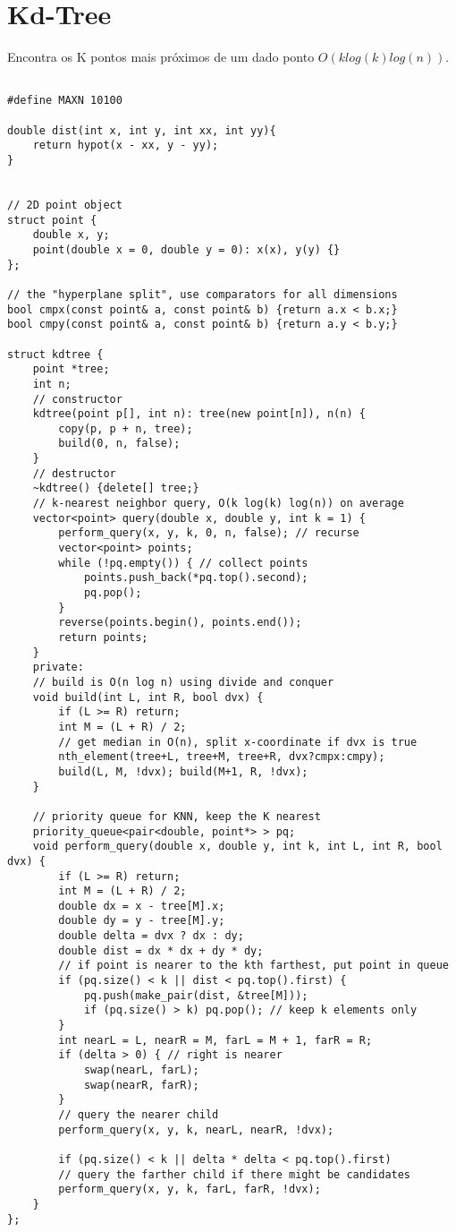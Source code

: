 \section{Kd-Tree}

Encontra os K pontos mais próximos de um dado ponto $O(k log(k) log(n))$.
\begin{multicols}{2}
	\begin{lstlisting}

#define MAXN 10100

double dist(int x, int y, int xx, int yy){
	return hypot(x - xx, y - yy);
}


// 2D point object
struct point {
	double x, y;
	point(double x = 0, double y = 0): x(x), y(y) {}	
};

// the "hyperplane split", use comparators for all dimensions
bool cmpx(const point& a, const point& b) {return a.x < b.x;}
bool cmpy(const point& a, const point& b) {return a.y < b.y;}

struct kdtree {
	point *tree;
	int n;
	// constructor
	kdtree(point p[], int n): tree(new point[n]), n(n) {
		copy(p, p + n, tree);
		build(0, n, false);
	}
	// destructor
	~kdtree() {delete[] tree;}
	// k-nearest neighbor query, O(k log(k) log(n)) on average
	vector<point> query(double x, double y, int k = 1) {
		perform_query(x, y, k, 0, n, false); // recurse
		vector<point> points;
		while (!pq.empty()) { // collect points
			points.push_back(*pq.top().second);
			pq.pop();
		}
		reverse(points.begin(), points.end());
		return points;
	}
	private:
	// build is O(n log n) using divide and conquer
	void build(int L, int R, bool dvx) {
		if (L >= R) return;
		int M = (L + R) / 2;
		// get median in O(n), split x-coordinate if dvx is true
		nth_element(tree+L, tree+M, tree+R, dvx?cmpx:cmpy);
		build(L, M, !dvx); build(M+1, R, !dvx);
	}
	
	// priority queue for KNN, keep the K nearest
	priority_queue<pair<double, point*> > pq;
	void perform_query(double x, double y, int k, int L, int R, bool dvx) {
		if (L >= R) return;
		int M = (L + R) / 2;
		double dx = x - tree[M].x;
		double dy = y - tree[M].y;
		double delta = dvx ? dx : dy;
		double dist = dx * dx + dy * dy;
		// if point is nearer to the kth farthest, put point in queue
		if (pq.size() < k || dist < pq.top().first) {
			pq.push(make_pair(dist, &tree[M]));
			if (pq.size() > k) pq.pop(); // keep k elements only
		}
		int nearL = L, nearR = M, farL = M + 1, farR = R;
		if (delta > 0) { // right is nearer
			swap(nearL, farL);
			swap(nearR, farR);
		}
		// query the nearer child
		perform_query(x, y, k, nearL, nearR, !dvx);
		
		if (pq.size() < k || delta * delta < pq.top().first)
		// query the farther child if there might be candidates
		perform_query(x, y, k, farL, farR, !dvx);
	}
};
\end{lstlisting}
\end{multicols}


